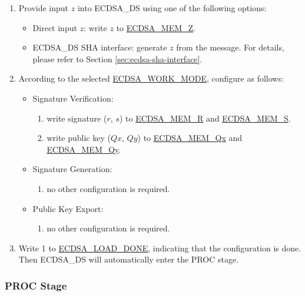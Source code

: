 \documentclass[main\_\_EN.tex]{subfiles}
\begin{document}
\begin{enumerate}
	\item Provide input $z$ into ECDSA\_DS using one of the following options:
	      \begin{itemize}
		      \item Direct input $z$: write $z$ to \hyperref[tab:ecdsa-memory]{ECDSA\_MEM\_Z}.
		      \item ECDSA\_DS SHA interface: generate $z$ from the message. For details, please refer to Section \ref{sec:ecdsa-sha-interface}.
	      \end{itemize}
	\item According to the selected \hyperref[fielddesc:ECDSAWORKMODE]{ECDSA\_WORK\_MODE}, configure as follows:
	      \begin{itemize}
		      \item Signature Verification:
		            \begin{enumerate}
			            \item write signature ($r$, $s$) to \hyperref[tab:ecdsa-memory]{ECDSA\_MEM\_R} and \hyperref[tab:ecdsa-memory]{ECDSA\_MEM\_S}.
			            \item write public key ($Qx$, $Qy$) to \hyperref[tab:ecdsa-memory]{ECDSA\_MEM\_Qx} and \hyperref[tab:ecdsa-memory]{ECDSA\_MEM\_Qy}.
		            \end{enumerate}
		      \item Signature Generation:
		            \begin{enumerate}
			            \item no other configuration is required.
		            \end{enumerate}
                \item Public Key Export:
		            \begin{enumerate}
                            \item no other configuration is required.
		            \end{enumerate}
	      \end{itemize}
	\item Write 1 to \hyperref[fielddesc:ECDSALOADDONE]{ECDSA\_LOAD\_DONE}, indicating that the configuration is done. Then ECDSA\_DS will automatically enter the PROC stage.
\end{enumerate}

\subsubsection{PROC Stage}
\end{document}
